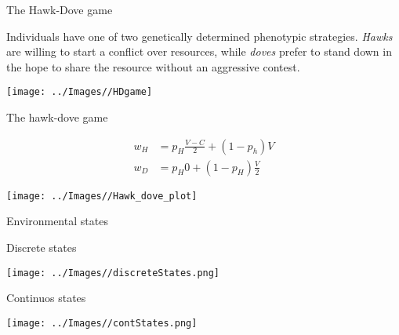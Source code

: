 \documentclass[
  ignorenonframetext,
]{beamer}
\begin{document}
\begin{frame}{The Hawk-Dove game}
\protect\hypertarget{the-hawk-dove-game}{}

Individuals have one of two genetically determined phenotypic
strategies. \emph{Hawks} are willing to start a conflict over resources,
while \emph{doves} prefer to stand down in the hope to share the
resource without an aggressive contest.

\begin{center}\texttt{[image: ../Images//HDgame]} \end{center}

\end{frame}

\begin{frame}{The hawk-dove game}
\protect\hypertarget{the-hawk-dove-game-1}{}

\begin{align*}
w_H &= p_H \frac{V-C}{2}+(1-p_h) V\\
w_D &= p_H 0 + (1-p_H)\frac{V}{2}
\end{align*} \vspace{-0.8cm}

\begin{center}\texttt{[image: ../Images//Hawk\_dove\_plot]} \end{center}

\end{frame}

\begin{frame}{Environmental states}
\protect\hypertarget{environmental-states}{}

\begin{block}{Discrete states}

\texttt{[image: ../Images//discreteStates.png]}

\pause

\end{block}

\begin{block}{Continuos states}

\texttt{[image: ../Images//contStates.png]}

\end{block}

\end{frame}
\end{document}
